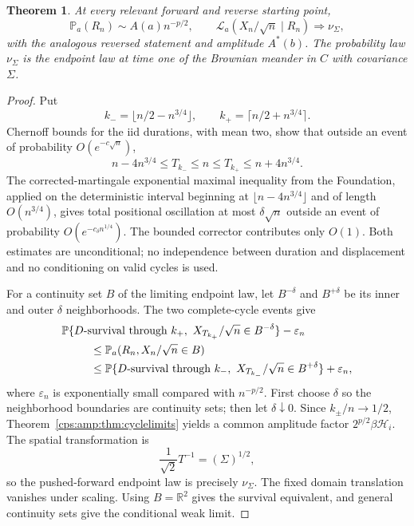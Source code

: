 \documentclass[11pt,letterpaper]{article}
\numberwithin{equation}{section}
\newtheorem{theorem}{Theorem}[section]
\theoremstyle{remark}\newtheorem{remark}[theorem]{Remark}
\newcommand{\PP}{\mathbb P}
\newcommand{\RR}{\mathbb R}
\begin{document}
\begin{theorem}\label{cps:amp:thm:exacttime}
At every relevant forward and reverse starting point,
\begin{equation}\label{cps:amp:eq:exacttime}
 \PP_a(R_n)\sim A(a)n^{-p/2},\qquad
 \mathcal L_a(X_n/\sqrt n\mid R_n)\Longrightarrow\nu_\Sigma,
\end{equation}
with the analogous reversed statement and amplitude $A^*(b)$. The probability law $\nu_\Sigma$ is the endpoint law at time one of the Brownian meander in $C$ with covariance $\Sigma$.
\end{theorem}
\begin{proof}
Put
\begin{equation}
 k_- =\lfloor n/2-n^{3/4}\rfloor,\qquad
 k_+ =\lceil n/2+n^{3/4}\rceil.
\end{equation}
Chernoff bounds for the iid durations, with mean two, show that outside an event of probability $O(e^{-c\sqrt n})$,
\begin{equation}\label{cps:amp:eq:clockwindow}
 n-4n^{3/4}\le T_{k_-}\le n\le T_{k_+}\le n+4n^{3/4}.
\end{equation}
The corrected-martingale exponential maximal inequality from the Foundation, applied on the deterministic interval beginning at $\lfloor n-4n^{3/4}\rfloor$ and of length $O(n^{3/4})$, gives total positional oscillation at most $\delta\sqrt n$ outside an event of probability $O(e^{-c_\delta n^{1/4}})$. The bounded corrector contributes only $O(1)$. Both estimates are unconditional; no independence between duration and displacement and no conditioning on valid cycles is used.

For a continuity set $B$ of the limiting endpoint law, let $B^{-\delta}$ and $B^{+\delta}$ be its inner and outer $\delta$ neighborhoods. The two complete-cycle events give
\begin{align}\label{cps:amp:eq:eventbracket}
 &\PP\{D\text{-survival through }k_+,\ X_{T_{k_+}}/\sqrt n\in B^{-\delta}\}-\varepsilon_n\notag\\
 &\hspace{9mm}\le\PP_a(R_n,X_n/\sqrt n\in B)\notag\\
 &\hspace{9mm}\le\PP\{D\text{-survival through }k_-,\ X_{T_{k_-}}/\sqrt n\in B^{+\delta}\}+\varepsilon_n,
\end{align}
where $\varepsilon_n$ is exponentially small compared with $n^{-p/2}$. First choose $\delta$ so the neighborhood boundaries are continuity sets; then let $\delta\downarrow0$. Since $k_\pm/n\to1/2$, Theorem~\ref{cps:amp:thm:cyclelimits} yields a common amplitude factor $2^{p/2}\beta\mathcal H_i$. The spatial transformation is
\begin{equation}
 \frac1{\sqrt2}T^{-1}=(\Sigma)^{1/2},
\end{equation}
so the pushed-forward endpoint law is precisely $\nu_\Sigma$. The fixed domain translation vanishes under scaling. Using $B=\RR^2$ gives the survival equivalent, and general continuity sets give the conditional weak limit.
\end{proof}
\end{document}
